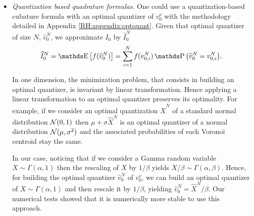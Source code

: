 \begin{itemize}[wide=0pt]
	\item {\em Quantization based quadrature formulas.} One could use a quantization-based cubature formula with an optimal quantizer of $v_0^{\nu}$ with the methodology detailed in Appendix \ref{RH:appendix:optquant}. Given that optimal quantizer of size $N$, $\widehat{v}_0^N$, we approximate $I_0$ by $\widehat{I}_0^N$
	      \begin{equation}
		      \widehat{I}_0^N = \E \big[ f (\widehat{v}_0^N) \big] = \sum_{i=1}^{N} f (v_{0,i}^N) \Prob \big( \widehat{v}_{0}^N = v_{0,i}^N \big).
	      \end{equation}


	      \begin{remarks}
		      In one dimension, the minimization problem, that consists in building an optimal quantizer, is invariant by linear transformation. Hence applying a linear transformation to an optimal quantizer preserves its optimality. For example, if we consider an optimal quantization $\widehat X^N$ of a standard normal distribution $\operatorname{\mathcal{N}} (0,1)$ then $\mu + \sigma \widehat X^N$ is an optimal quantizer of a normal distribution $\operatorname{\mathcal{N}} (\mu, \sigma^2)$ and the associated probabilities of each Voronoï centroid stay the same.


		      In our case, noticing that if we consider a Gamma random variable $X \sim \Gamma(\alpha, 1)$ then the rescaling of $X$ by $1/\beta$ yields $X/\beta \sim \Gamma(\alpha, \beta)$. Hence, for building the optimal quantizer $\widehat v_0^N$ of $v_0^{\nu}$, we can build an optimal quantizer of $X \sim \Gamma(\alpha, 1)$ and then rescale it by $1 / \beta$, yielding $\widehat v_0^N = \widehat{X}^N / \beta$. Our numerical tests showed that it is numerically more stable to use this approach.



\end{remarks}
\end{itemize}
